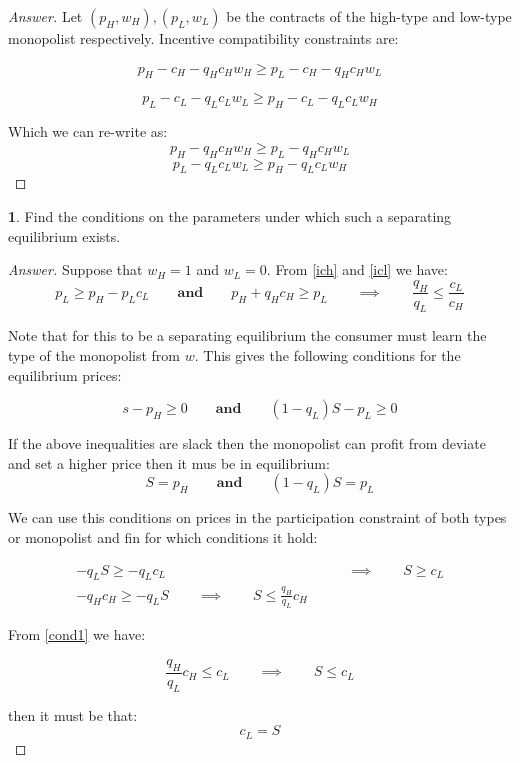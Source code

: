 \documentclass[12pt]{article}
\theoremstyle{definition}
\newtheorem{subproblem}{}[problem]
\newcommand{\qiq}{\qquad \implies \qquad}
\newcommand{\qaq}{\qquad \textbf{and} \qquad}
\begin{document}
\begin{proof}[Answer]
Let $\left(p_{H}, w_{H}\right),\left(p_{L}, w_{L}\right)$ be the contracts of the high-type and low-type monopolist respectively. Incentive compatibility constraints are:

\begin{equation}\tag{IC_H}
    p_H-c_H - q_H c_H w_H \geq p_L-c_H - q_H c_H w_L
\end{equation}

\begin{equation}\tag{IC_L}
    p_L-c_L - q_L c_L w_L \geq p_H-c_L - q_L c_L w_H
\end{equation}

Which we can re-write as:
\begin{equation}\tag{IC_H'}\label{ich}
    p_H - q_H c_H w_H \geq p_L - q_H c_H w_L
\end{equation}
\begin{equation}\tag{IC_L'}\label{icl}
   p_L - q_L c_L w_L \geq p_H - q_L c_L w_H
 \end{equation}
\end{proof}
\begin{subproblem}
Find the conditions on the parameters under which such a separating equilibrium exists.
\end{subproblem}
\begin{proof}[Answer]
Suppose that $w_H = 1$ and $w_L=0$. From \eqref{ich} and \eqref{icl} we have:
\begin{equation}\label{cond1}
p_{L} \geqslant p_{H}-p_{L} c_{L} \qaq p_{H}+q_{H} c_{H} \geqslant p_{L} \qiq \boxed{\frac{q_H}{q_L} \leq \frac{c_L}{c_H}}\end{equation}

Note that for this to be a separating equilibrium the consumer must learn the type of the monopolist from $w$. This gives the following conditions for the equilibrium prices:

$$s-p_H \geq 0 \qaq (1-q_L)S - p_L \geq 0$$

If the above inequalities are slack then the monopolist can profit from deviate and set a higher price then it mus be in equilibrium:
$$S = p_H  \qaq (1-q_L)S  = p_L$$

We can use this conditions on prices in the participation constraint of both types or monopolist and fin for which conditions it hold:

\begin{align*}
    -q_L S \geq - q_L c_L &\qiq S\geq c_L\\
    -q_H c_H \geq -q_L S \qiq S \leq \frac{q_H}{q_L}c_H
\end{align*}

From \eqref{cond1} we have:

$$\frac{q_H}{q_L}c_H \leq c_L \qiq  S \leq c_L$$

then it must be that:
$$\boxed{c_L = S}$$



\end{proof}
\end{document}

